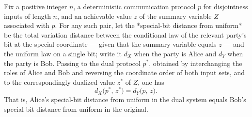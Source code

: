 \begin{theorem}
\label{CommunicationComplexity.Functions.Disjointness.RandomizedLowerBound.xDistance_dualProtocol_dualZValue_eq_yDistance}
\leanok
{}
Fix a positive integer $n$, a deterministic communication protocol $p$ for disjointness
inputs of length $n$, and an achievable value $z$ of the summary variable $Z$ associated
with $p$. For any such pair, let the *special-bit distance from uniform* be the total
variation distance between the conditional law of the relevant party's bit at the
special coordinate — given that the summary variable equals $z$ — and the uniform law on
a single bit; write it $d_X$ when the party is Alice and $d_Y$ when the party is Bob.
Passing to the dual protocol $p^{*}$, obtained by interchanging the roles of Alice and
Bob and reversing the coordinate order of both input sets, and to the correspondingly
dualized value $z^{*}$ of $Z$, one has \[ d_X\bigl(p^{*},\,z^{*}\bigr) =
d_Y\bigl(p,\,z\bigr). \] That is, Alice's special-bit distance from uniform in the dual
system equals Bob's special-bit distance from uniform in the original.
\end{theorem}

